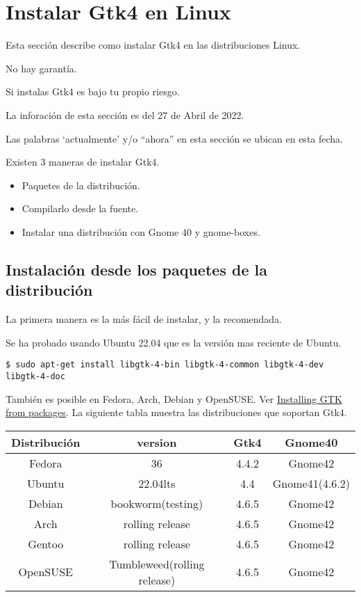 \hypertarget{instalar-gtk4-en-linux}{%
\section{Instalar Gtk4 en Linux}\label{instalar-gtk4-en-linux}}

Esta sección describe como instalar Gtk4 en las distribuciones Linux.

No hay garantía.

Si instalas Gtk4 es bajo tu propio riesgo.

La inforación de esta sección es del 27 de Abril de 2022.

Las palabras `actualmente' y/o ``ahora'' en esta sección se ubican en
esta fecha.

Existen 3 maneras de instalar Gtk4.

\begin{itemize}
\tightlist
\item
  Paquetes de la distribución.
\item
  Compilarlo desde la fuente.
\item
  Instalar una distribución con Gnome 40 y gnome-boxes.
\end{itemize}

\hypertarget{instalaciuxf3n-desde-los-paquetes-de-la-distribuciuxf3n}{%
\subsection{Instalación desde los paquetes de la
distribución}\label{instalaciuxf3n-desde-los-paquetes-de-la-distribuciuxf3n}}

La primera manera es la más fácil de instalar, y la recomendada.

Se ha probado usando Ubuntu 22.04 que es la versión mas reciente de
Ubuntu.

\begin{lstlisting}
$ sudo apt-get install libgtk-4-bin libgtk-4-common libgtk-4-dev libgtk-4-doc
\end{lstlisting}

También es posible en Fedora, Arch, Debian y OpenSUSE. Ver
\href{https://www.gtk.org/docs/installations/linux\#installing-gtk-from-packages}{Installing
GTK from packages}. La siguiente tabla muestra las distribuciones que
soportan Gtk4.

\begin{longtable}[]{@{}cccc@{}}
\toprule
Distribución & version & Gtk4 & Gnome40\tabularnewline
\midrule
\endhead
Fedora & 36 & 4.4.2 & Gnome42\tabularnewline
Ubuntu & 22.04lts & 4.4 & Gnome41(4.6.2)\tabularnewline
Debian & bookworm(testing) & 4.6.5 & Gnome42\tabularnewline
Arch & rolling release & 4.6.5 & Gnome42\tabularnewline
Gentoo & rolling release & 4.6.5 & Gnome42\tabularnewline
OpenSUSE & Tumbleweed(rolling release) & 4.6.5 & Gnome42\tabularnewline
\bottomrule
\end{longtable}

